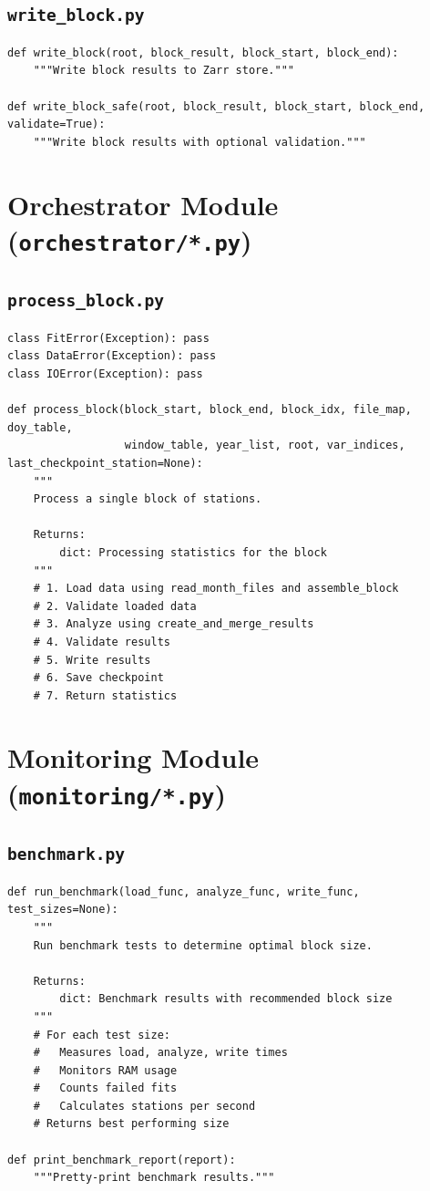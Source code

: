 ﻿\documentclass[12pt,a4paper]{report}
\begin{document}
\subsection{\texttt{write\_block.py}}
\begin{lstlisting}[caption=write\_block.py]
def write_block(root, block_result, block_start, block_end):
    """Write block results to Zarr store."""

def write_block_safe(root, block_result, block_start, block_end, validate=True):
    """Write block results with optional validation."""
\end{lstlisting}

\section{Orchestrator Module (\texttt{orchestrator/*.py})}
\subsection{\texttt{process\_block.py}}
\begin{lstlisting}[caption=process\_block.py]
class FitError(Exception): pass
class DataError(Exception): pass
class IOError(Exception): pass

def process_block(block_start, block_end, block_idx, file_map, doy_table,
                  window_table, year_list, root, var_indices, last_checkpoint_station=None):
    """
    Process a single block of stations.
    
    Returns:
        dict: Processing statistics for the block
    """
    # 1. Load data using read_month_files and assemble_block
    # 2. Validate loaded data
    # 3. Analyze using create_and_merge_results
    # 4. Validate results
    # 5. Write results
    # 6. Save checkpoint
    # 7. Return statistics
\end{lstlisting}

\section{Monitoring Module (\texttt{monitoring/*.py})}
\subsection{\texttt{benchmark.py}}
\begin{lstlisting}[caption=benchmark.py]
def run_benchmark(load_func, analyze_func, write_func, test_sizes=None):
    """
    Run benchmark tests to determine optimal block size.
    
    Returns:
        dict: Benchmark results with recommended block size
    """
    # For each test size:
    #   Measures load, analyze, write times
    #   Monitors RAM usage
    #   Counts failed fits
    #   Calculates stations per second
    # Returns best performing size

def print_benchmark_report(report):
    """Pretty-print benchmark results."""
\end{lstlisting}
\end{document}
